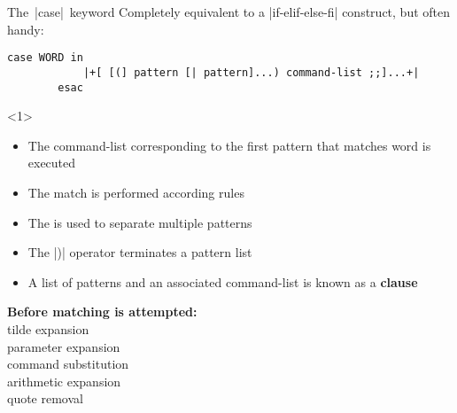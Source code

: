
\begin{frame}[fragile]{The \,\bash|case|\, keyword}
    \vspace{-3mm}
    Completely equivalent to a \bash|if-elif-else-fi| construct, but often handy:
    \medskip
    \begin{lstlisting}[style=MyBash, numbers=none, belowskip=-5mm]
        case WORD in
            |+[ [(] pattern [| pattern]...) command-list ;;]...+|
        esac
    \end{lstlisting}
    \begin{overlayarea}{\textwidth}{\textheight}
        \begin{onlyenv}<1>
            \begin{itemize}
                \setlength{\itemsep}{0mm}
                \item The command-list corresponding to the first pattern that matches word is executed
                \item The match is performed according  rules
                \item The \bash{|} is used to separate multiple patterns
                \item The \bash|)| operator terminates a pattern list
                \item A list of patterns and an associated command-list is known as a \textbf{clause}
            \end{itemize}
            \vspace{-5mm}
            \begin{center}
                \alert{\textbf{Before matching is attempted:}}\\[0.3em]
                tilde expansion\\
                parameter expansion\\
                command substitution\\
                arithmetic expansion\\
                quote removal
            \end{center}
        \end{onlyenv}
\end{overlayarea}
\end{frame}
